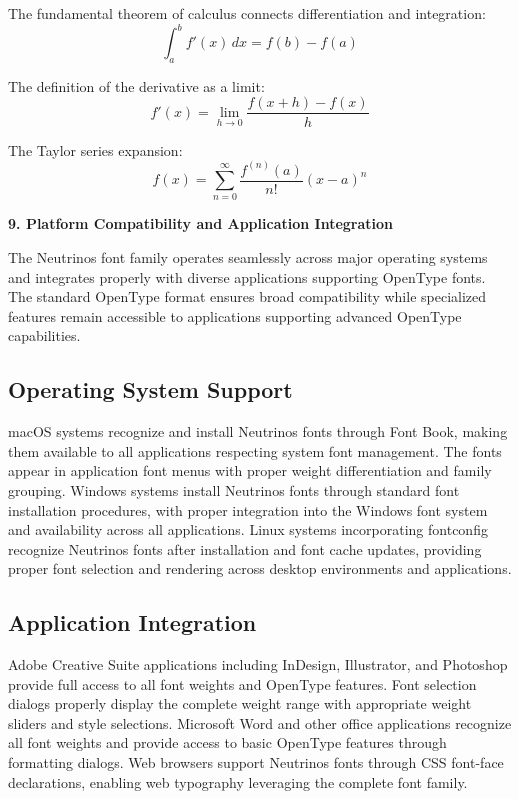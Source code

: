 \documentclass[11pt,letterpaper]{article}
\newcommand{\sectionheader}[1]{%
\vspace{1em}
\noindent
\colorbox{neutrinosblue}{%
\begin{minipage}{\textwidth}
\vspace{0.3em}
{\color{white}\LARGE\textbf{#1}}
\vspace{0.3em}
\end{minipage}}
\vspace{0.5em}
}
\begin{document}
The fundamental theorem of calculus connects differentiation and integration:
\[
\int_a^b f'(x)\,dx = f(b) - f(a)
\]

The definition of the derivative as a limit:
\[
f'(x) = \lim_{h \to 0} \frac{f(x+h) - f(x)}{h}
\]

The Taylor series expansion:
\[
f(x) = \sum_{n=0}^{\infty} \frac{f^{(n)}(a)}{n!}(x-a)^n
\]

\newpage

\sectionheader{9. Platform Compatibility and Application Integration}

The Neutrinos font family operates seamlessly across major operating systems and integrates properly with diverse applications supporting OpenType fonts. The standard OpenType format ensures broad compatibility while specialized features remain accessible to applications supporting advanced OpenType capabilities.

\subsection{Operating System Support}

macOS systems recognize and install Neutrinos fonts through Font Book, making them available to all applications respecting system font management. The fonts appear in application font menus with proper weight differentiation and family grouping. Windows systems install Neutrinos fonts through standard font installation procedures, with proper integration into the Windows font system and availability across all applications. Linux systems incorporating fontconfig recognize Neutrinos fonts after installation and font cache updates, providing proper font selection and rendering across desktop environments and applications.

\subsection{Application Integration}

Adobe Creative Suite applications including InDesign, Illustrator, and Photoshop provide full access to all font weights and OpenType features. Font selection dialogs properly display the complete weight range with appropriate weight sliders and style selections. Microsoft Word and other office applications recognize all font weights and provide access to basic OpenType features through formatting dialogs. Web browsers support Neutrinos fonts through CSS font-face declarations, enabling web typography leveraging the complete font family.
\end{document}

